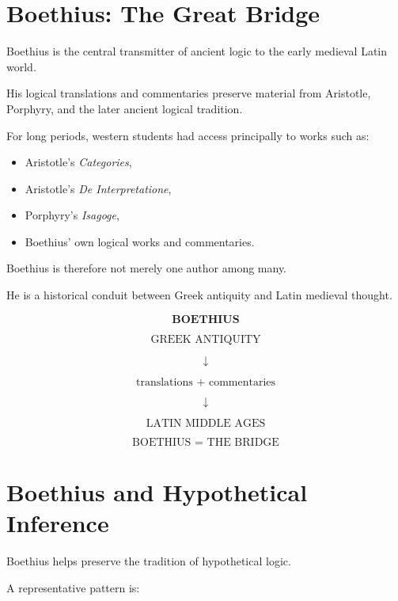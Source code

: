 \documentclass[11pt]{article}
\begin{document}
\section{Boethius: The Great Bridge}

Boethius is the central transmitter of ancient logic to the early
medieval Latin world.

His logical translations and commentaries preserve material from
Aristotle, Porphyry, and the later ancient logical tradition.

For long periods, western students had access principally to works
such as:

\begin{itemize}
    \item Aristotle's \textit{Categories},
    \item Aristotle's \textit{De Interpretatione},
    \item Porphyry's \textit{Isagoge},
    \item Boethius' own logical works and commentaries.
\end{itemize}

Boethius is therefore not merely one author among many.

He is a historical conduit between Greek antiquity and Latin
medieval thought.

\begin{whiteboard}
\[
\textbf{BOETHIUS}
\]

\[
\text{GREEK ANTIQUITY}
\]

\[
\downarrow
\]

\[
\text{translations + commentaries}
\]

\[
\downarrow
\]

\[
\text{LATIN MIDDLE AGES}
\]

\[
\boxed{\text{BOETHIUS = THE BRIDGE}}
\]
\end{whiteboard}

\section{Boethius and Hypothetical Inference}

Boethius helps preserve the tradition of hypothetical logic.

A representative pattern is:
\end{document}
